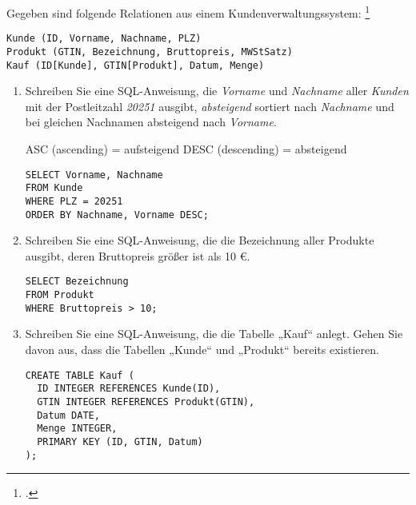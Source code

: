 \documentclass{bschlangaul-aufgabe}
\begin{document}

Gegeben sind folgende Relationen aus einem Kundenverwaltungssystem:
\footcite[SQL Einstieg, Aufgabe 6]{db:pu:1}

\begin{verbatim}
Kunde (ID, Vorname, Nachname, PLZ)
Produkt (GTIN, Bezeichnung, Bruttopreis, MWStSatz)
Kauf (ID[Kunde], GTIN[Produkt], Datum, Menge)
\end{verbatim}

\begin{enumerate}


\item Schreiben Sie eine SQL-Anweisung, die \emph{Vorname} und
\emph{Nachname} aller \emph{Kunden} mit der Postleitzahl \emph{20251}
ausgibt, \emph{absteigend} sortiert nach \emph{Nachname} und bei
gleichen Nachnamen absteigend nach \emph{Vorname}.

ASC (ascending) = aufsteigend
DESC (descending) = absteigend

\begin{bAntwort}
\begin{verbatim}
SELECT Vorname, Nachname
FROM Kunde
WHERE PLZ = 20251
ORDER BY Nachname, Vorname DESC;
\end{verbatim}
\end{bAntwort}


\item Schreiben Sie eine SQL-Anweisung, die die Bezeichnung aller
Produkte ausgibt, deren Bruttopreis größer ist als 10 €.

\begin{bAntwort}
\begin{verbatim}
SELECT Bezeichnung
FROM Produkt
WHERE Bruttopreis > 10;
\end{verbatim}
\end{bAntwort}


\item Schreiben Sie eine SQL-Anweisung, die die Tabelle „Kauf“ anlegt.
Gehen Sie davon aus, dass die Tabellen „Kunde“ und „Produkt“ bereits
existieren.

\begin{bAntwort}
\begin{verbatim}
CREATE TABLE Kauf (
  ID INTEGER REFERENCES Kunde(ID),
  GTIN INTEGER REFERENCES Produkt(GTIN),
  Datum DATE,
  Menge INTEGER,
  PRIMARY KEY (ID, GTIN, Datum)
);
\end{verbatim}
\end{bAntwort}
\end{enumerate}
\end{document}
